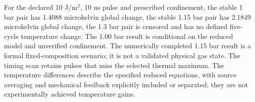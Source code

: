 For the declared 10 J/m$^2$, 10 ns pulse and prescribed confinement, the stable 1 bar pair has 1.4088 microkelvin global change, the stable 1.15 bar pair has 2.1849 microkelvin global change, the 1.3 bar pair is censored and has no defined five-cycle temperature change. The 1.00 bar result is conditional on the reduced model and unverified confinement. The numerically completed 1.15 bar result is a formal fixed-composition scenario; it is not a validated physical gas state. The timing scan retains pulses that miss the selected thermal maximum. The temperature differences describe the specified reduced equations, with source averaging and mechanical feedback explicitly included or separated; they are not experimentally achieved temperature gains.
